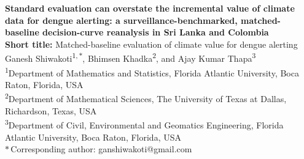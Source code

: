 \documentclass[11pt,a4paper]{article}
\begin{document}
\thispagestyle{fancy}
\begin{center}
{\Large \textbf{Standard evaluation can overstate the incremental value of climate data for dengue alerting: a surveillance-benchmarked, matched-baseline decision-curve reanalysis in Sri Lanka and Colombia}}\\[1.0em]

{\normalsize \textbf{Short title:} Matched-baseline evaluation of climate value for dengue alerting}\\[1.2em]

Ganesh Shiwakoti\textsuperscript{1,\,$\ast$}, Bhimsen Khadka\textsuperscript{2}, and Ajay Kumar Thapa\textsuperscript{3}\\[0.6em]

\footnotesize
\textsuperscript{1}Department of Mathematics and Statistics, Florida Atlantic University, Boca Raton, Florida, USA\\
\textsuperscript{2}Department of Mathematical Sciences, The University of Texas at Dallas, Richardson, Texas, USA\\
\textsuperscript{3}Department of Civil, Environmental and Geomatics Engineering, Florida Atlantic University, Boca Raton, Florida, USA\\[0.3em]
$\ast$\,Corresponding author: ganshiwakoti@gmail.com
\end{center}

\vspace{1em}
\begin{center}
\ifdefined\internalcompletion
{}
\else
{}
\fi
\end{center}

\newpage
\end{document}
